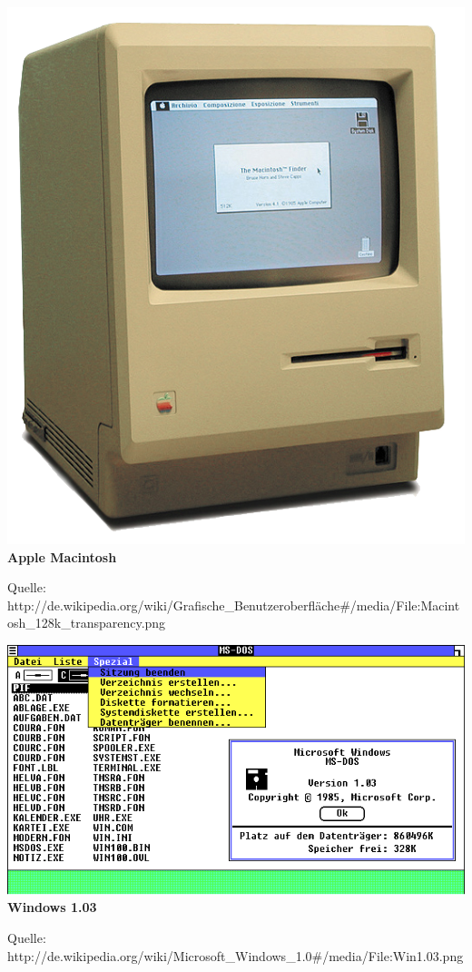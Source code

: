 \documentclass[12pt,a4paper]{report}
\begin{document}
\begin{onehalfspace}
\begin{center}
\includegraphics[scale=0.6]{../docs/lyaton/graphics/Apple-Macintosh.png}\\
\textbf{Apple Macintosh}\\
\begin{scriptsize}
Quelle: http://de.wikipedia.org/wiki/Grafische\_Benutzeroberfläche\#/media/File:Macintosh\_128k\_transparency.png
\end{scriptsize}
\end{center}

\begin{center}
\includegraphics[scale=0.6]{../docs/lyaton/graphics/Windows-1_03.png}\\
\textbf{Windows 1.03}\\
\begin{scriptsize}
Quelle: http://de.wikipedia.org/wiki/Microsoft\_Windows\_1.0\#/media/File:Win1.03.png
\end{scriptsize}
\end{center}


\end{onehalfspace}
\end{document}
